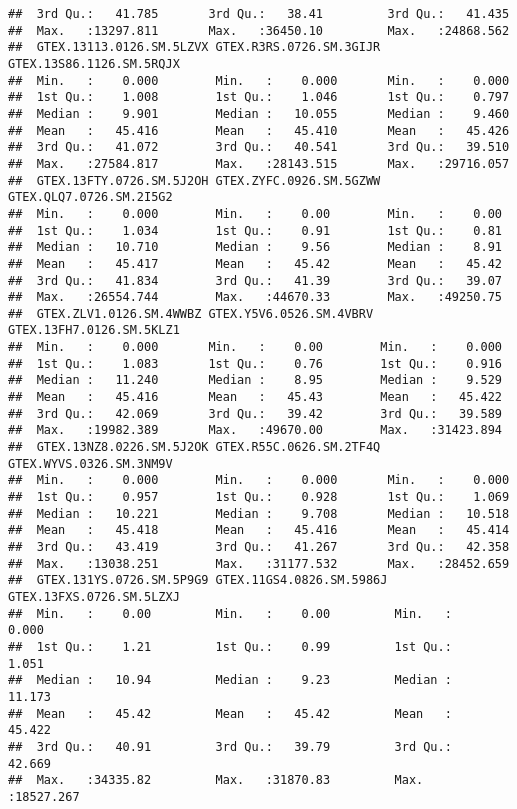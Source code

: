 \documentclass[
]{article}
\begin{document}
\begin{verbatim}
##  3rd Qu.:   41.785       3rd Qu.:   38.41         3rd Qu.:   41.435      
##  Max.   :13297.811       Max.   :36450.10         Max.   :24868.562      
##  GTEX.13113.0126.SM.5LZVX GTEX.R3RS.0726.SM.3GIJR GTEX.13S86.1126.SM.5RQJX
##  Min.   :    0.000        Min.   :    0.000       Min.   :    0.000       
##  1st Qu.:    1.008        1st Qu.:    1.046       1st Qu.:    0.797       
##  Median :    9.901        Median :   10.055       Median :    9.460       
##  Mean   :   45.416        Mean   :   45.410       Mean   :   45.426       
##  3rd Qu.:   41.072        3rd Qu.:   40.541       3rd Qu.:   39.510       
##  Max.   :27584.817        Max.   :28143.515       Max.   :29716.057       
##  GTEX.13FTY.0726.SM.5J2OH GTEX.ZYFC.0926.SM.5GZWW GTEX.QLQ7.0726.SM.2I5G2
##  Min.   :    0.000        Min.   :    0.00        Min.   :    0.00       
##  1st Qu.:    1.034        1st Qu.:    0.91        1st Qu.:    0.81       
##  Median :   10.710        Median :    9.56        Median :    8.91       
##  Mean   :   45.417        Mean   :   45.42        Mean   :   45.42       
##  3rd Qu.:   41.834        3rd Qu.:   41.39        3rd Qu.:   39.07       
##  Max.   :26554.744        Max.   :44670.33        Max.   :49250.75       
##  GTEX.ZLV1.0126.SM.4WWBZ GTEX.Y5V6.0526.SM.4VBRV GTEX.13FH7.0126.SM.5KLZ1
##  Min.   :    0.000       Min.   :    0.00        Min.   :    0.000       
##  1st Qu.:    1.083       1st Qu.:    0.76        1st Qu.:    0.916       
##  Median :   11.240       Median :    8.95        Median :    9.529       
##  Mean   :   45.416       Mean   :   45.43        Mean   :   45.422       
##  3rd Qu.:   42.069       3rd Qu.:   39.42        3rd Qu.:   39.589       
##  Max.   :19982.389       Max.   :49670.00        Max.   :31423.894       
##  GTEX.13NZ8.0226.SM.5J2OK GTEX.R55C.0626.SM.2TF4Q GTEX.WYVS.0326.SM.3NM9V
##  Min.   :    0.000        Min.   :    0.000       Min.   :    0.000      
##  1st Qu.:    0.957        1st Qu.:    0.928       1st Qu.:    1.069      
##  Median :   10.221        Median :    9.708       Median :   10.518      
##  Mean   :   45.418        Mean   :   45.416       Mean   :   45.414      
##  3rd Qu.:   43.419        3rd Qu.:   41.267       3rd Qu.:   42.358      
##  Max.   :13038.251        Max.   :31177.532       Max.   :28452.659      
##  GTEX.131YS.0726.SM.5P9G9 GTEX.11GS4.0826.SM.5986J GTEX.13FXS.0726.SM.5LZXJ
##  Min.   :    0.00         Min.   :    0.00         Min.   :    0.000       
##  1st Qu.:    1.21         1st Qu.:    0.99         1st Qu.:    1.051       
##  Median :   10.94         Median :    9.23         Median :   11.173       
##  Mean   :   45.42         Mean   :   45.42         Mean   :   45.422       
##  3rd Qu.:   40.91         3rd Qu.:   39.79         3rd Qu.:   42.669       
##  Max.   :34335.82         Max.   :31870.83         Max.   :18527.267
\end{verbatim}
\end{document}
